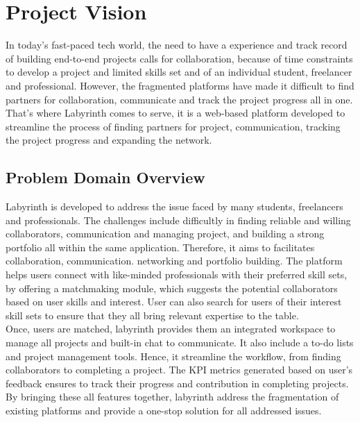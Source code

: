 \documentclass{FastFyp}
\begin{document}




\chapter{Project Vision}
In today's fast-paced tech world, the need to have a experience and track record of building end-to-end projects calls for collaboration, because of time constraints to develop a project and limited skills set and of an individual student, freelancer and professional. However, the fragmented platforms have made it difficult to find partners for collaboration, communicate and track the project progress all in one. That's where Labyrinth comes to serve, it is a web-based platform developed to streamline the process of finding partners for project, communication, tracking the project progress and expanding the network.
\section{Problem Domain Overview}
Labyrinth is developed to address the issue faced by many students, freelancers and professionals. The challenges include difficultly in finding reliable and willing collaborators, communication and managing project, and building a strong portfolio all within the same application. Therefore, it aims to facilitates collaboration, communication. networking and portfolio building. The platform helps users connect with like-minded professionals with their preferred skill sets, by offering a matchmaking module, which suggests the potential collaborators based on user skills and interest. User can also search for users of their interest skill sets to ensure that they all bring relevant expertise to the table. \\
Once, users are matched, labyrinth provides them an integrated workspace to manage all projects and built-in chat to communicate. It also include a to-do lists and project management tools. Hence, it streamline the workflow, from finding collaborators to completing a project. The KPI metrics generated based on user's feedback ensures to track their progress and contribution in completing projects. By bringing these all features together, labyrinth address the fragmentation of existing platforms and provide a one-stop solution for all addressed issues.  
\end{document}

